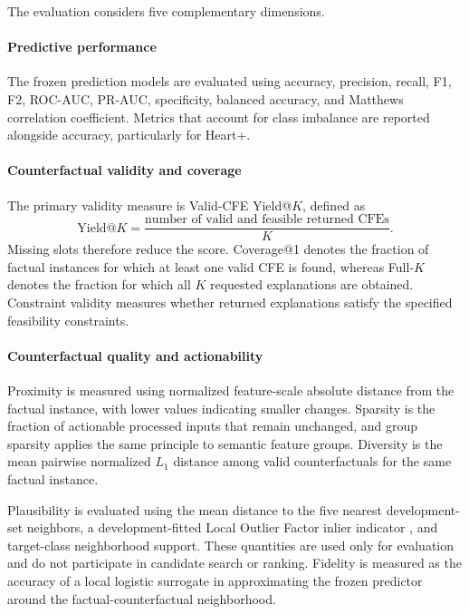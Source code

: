 \documentclass[preprint,12pt]{elsarticle}
\begin{document}
The evaluation considers five complementary dimensions.

\paragraph{Predictive performance}
The frozen prediction models are evaluated using accuracy, precision, recall,
F1, F2, ROC-AUC, PR-AUC, specificity, balanced accuracy, and Matthews
correlation coefficient. Metrics that account for class imbalance are reported
alongside accuracy, particularly for Heart+.

\paragraph{Counterfactual validity and coverage}
The primary validity measure is Valid-CFE Yield@$K$, defined as
\begin{equation}
\mathrm{Yield@}K
=
\frac{\text{number of valid and feasible returned CFEs}}{K}.
\end{equation}
Missing slots therefore reduce the score. Coverage@1 denotes the fraction of
factual instances for which at least one valid CFE is found, whereas Full-$K$
denotes the fraction for which all $K$ requested explanations are obtained.
Constraint validity measures whether returned explanations satisfy the
specified feasibility constraints.

\paragraph{Counterfactual quality and actionability}
Proximity is measured using normalized feature-scale absolute distance from the
factual instance, with lower values indicating smaller changes. Sparsity is the
fraction of actionable processed inputs that remain unchanged, and group
sparsity applies the same principle to semantic feature groups. Diversity is
the mean pairwise normalized $L_1$ distance among valid counterfactuals for the
same factual instance.

Plausibility is evaluated using the mean distance to the five nearest
development-set neighbors, a development-fitted Local Outlier Factor inlier
indicator \cite{breunig2000lof}, and target-class neighborhood support. These quantities are used
only for evaluation and do not participate in candidate search or ranking.
Fidelity is measured as the accuracy of a local logistic surrogate in
approximating the frozen predictor around the factual-counterfactual
neighborhood.
\end{document}
